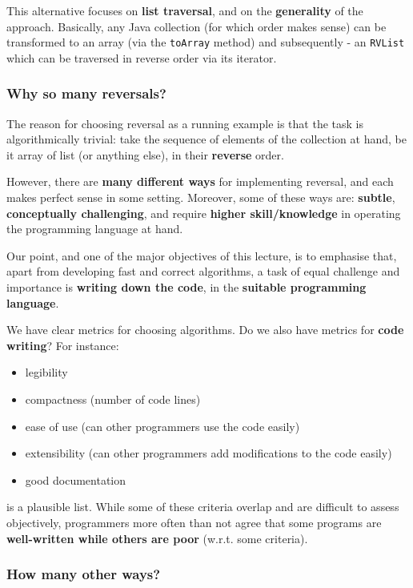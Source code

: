 This alternative focuses on \textbf{list traversal}, and on the \textbf{generality} of the approach. Basically, any Java collection (for which order makes sense) can be transformed to an array (via the \texttt{toArray} method) and subsequently - an \texttt{RVList} which can be traversed in reverse order via its iterator.

\subsubsection*{ Why so many reversals? }

The reason for choosing reversal as a running example is that the task is algorithmically trivial: take the sequence of elements of the collection at hand, be it array of list (or anything else), in their \textbf{reverse} order.

However, there are \textbf{many different ways} for implementing reversal, and each makes perfect sense in some setting. Moreover, some of these ways are: \textbf{subtle}, \textbf{conceptually challenging}, and require \textbf{higher skill/knowledge} in operating the programming language at hand. 

Our point, and one of the major objectives of this lecture, is to emphasise that, apart from developing fast and correct algorithms, a task of equal challenge and importance is \textbf{writing down the code}, in the \textbf{suitable programming language}.

We have clear metrics for choosing algorithms. Do we also have metrics for \textbf{code writing}? For instance:
\begin{itemize}
	\item  legibility
	\item  compactness (number of code lines)
	\item  ease of use (can other programmers use the code easily)
	\item  extensibility (can other programmers add modifications to the code easily)
	\item  good documentation
\end{itemize}

is a plausible list. While some of these criteria overlap and are difficult to assess objectively, programmers more often than not agree that some programs are \textbf{well-written while others are poor} (w.r.t. some criteria).

\subsubsection*{ How many other ways? }

